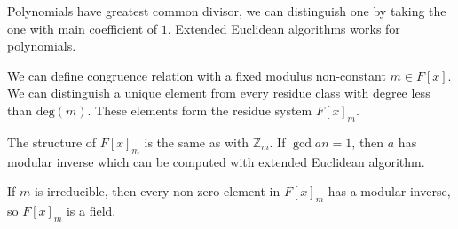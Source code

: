 \documentclass{article}
\newcommand{\Z}{\mathbb{Z}}
\begin{document}
Polynomials have greatest common divisor, we can distinguish one by taking the one with main coefficient of $1$.
Extended Euclidean algorithms works for polynomials.

We can define congruence relation with a fixed modulus non-constant $m \in F[x]$.
We can distinguish a unique element from every residue class with degree less than $\mathrm{deg}(m)$.
These elements form the residue system $F[x]_m$.

The structure of $F[x]_m$ is the same as with $\Z_m$.
If $\gcd{a}{n}=1$, then $a$ has modular inverse which can be computed with extended Euclidean algorithm.

If $m$ is irreducible, then every non-zero element in $F[x]_m$ has a modular inverse, so $F[x]_m$ is a field.
\end{document}
